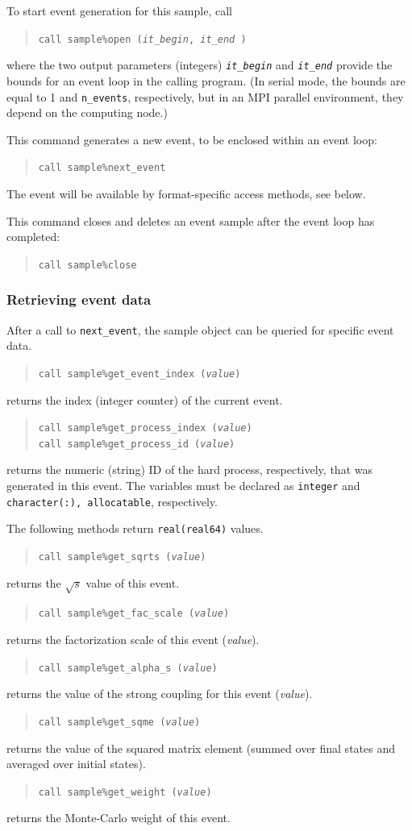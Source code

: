 \documentclass[12pt]{book}
\newcommand{\ttt}[1]{\texttt{#1}}
\begin{document}
To start event generation for this sample, call
\begin{quote}
  \tt call sample\%open (\textit{it\_begin}, \textit{it\_end} )
\end{quote}
where the two output parameters (integers) \ttt{\it it\_begin} and \ttt{\it it\_end}
provide the bounds for an event loop in the calling program.  (In serial mode,
the bounds are equal to 1 and \ttt{n\_events}, respectively, but in an MPI
parallel environment, they depend on the computing node.)

This command generates a new event, to be enclosed within an event loop:
\begin{quote}
  \tt call sample\%next\_event
\end{quote}
The event will be available by format-specific access methods, see below.

This command closes and deletes an event sample after the event loop has
completed:
\begin{quote}
  \tt call sample\%close
\end{quote}

\subsubsection{Retrieving event data}

After a call to \ttt{next\_event}, the sample object can be queried for
specific event data.
\begin{quote}
  \tt call sample\%get\_event\_index (\textit{value})
\end{quote}
returns the index (integer counter) of the current event.
\begin{quote}
  \tt call sample\%get\_process\_index (\textit{value})
  \\
  \tt call sample\%get\_process\_id (\textit{value})
\end{quote}
returns the numeric (string) ID of the hard process, respectively, that was
generated in this event.  The variables must be declared as \ttt{integer} and
\ttt{character(:), allocatable}, respectively.

The following methods return \ttt{real(real64)} values.
\begin{quote}
  \tt call sample\%get\_sqrts (\textit{value})
\end{quote}
returns the $\sqrt{s}$ value of this event.
\begin{quote}
  \tt call sample\%get\_fac\_scale (\textit{value})
\end{quote}
returns the factorization scale of this event (\textit{value}).
\begin{quote}
  \tt call sample\%get\_alpha\_s (\textit{value})
\end{quote}
returns the value of the strong coupling for this event (\textit{value}).
\begin{quote}
  \tt call sample\%get\_sqme (\textit{value})
\end{quote}
returns the value of the squared matrix element (summed over final states and
averaged over initial states).
\begin{quote}
  \tt call sample\%get\_weight (\textit{value})
\end{quote}
returns the Monte-Carlo weight of this event.
\end{document}
